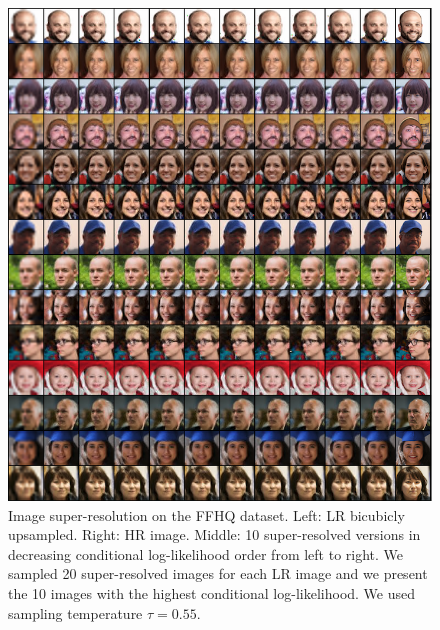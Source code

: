 \clearpage

\begin{figure}[h!]
    \centering
    \includegraphics[width=\textwidth]{Chapter1/paper_graphs/SupplementaryMaterial/ffhq_super_0.55_0_cropped.png}
    \caption{Image super-resolution on the FFHQ dataset. Left: LR bicubicly upsampled. Right: HR image. Middle: 10 super-resolved versions in decreasing conditional log-likelihood order from left to right. We sampled 20 super-resolved images for each LR image and we present the 10 images with the highest conditional log-likelihood. We used sampling temperature $\tau=0.55$.}
\end{figure}

\clearpage

